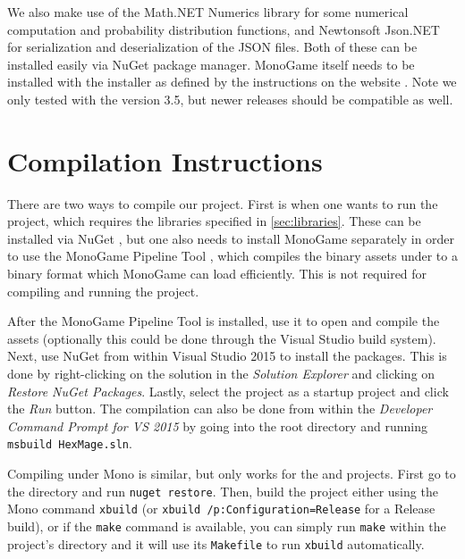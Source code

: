 We also make use of the Math.NET Numerics \citep{math-dotnet} library for some numerical computation and probability distribution functions, and Newtonsoft Json.NET \citep{json-dotnet} for serialization and deserialization of the JSON files. Both of these can be installed easily via NuGet \citep{nuget} package manager. MonoGame itself needs to be installed with the installer as defined by the instructions on the website \citep{monogame}. Note we only tested with the version 3.5, but newer releases should be compatible as well.

\section{Compilation Instructions}

There are two ways to compile our project. First is when one wants to run the  project, which requires the libraries specified in \autoref{sec:libraries}. These can be installed via NuGet \citep{nuget}, but one also needs to install MonoGame separately in order to use the MonoGame Pipeline Tool \citep{monogame-pipeline}, which compiles the binary assets under  to a binary format which MonoGame can load efficiently. This is not required for compiling and running the  project.

After the MonoGame Pipeline Tool is installed, use it to open  and compile the assets (optionally this could be done through the Visual Studio build system). Next, use NuGet from within Visual Studio 2015 to install the packages. This is done by right-clicking on the  solution in the \emph{Solution Explorer} and clicking on \emph{Restore NuGet Packages}. Lastly, select the  project as a startup project and click the \emph{Run} button. The compilation can also be done from within the \emph{Developer Command Prompt for VS 2015} by going into the root  directory and running \verb|msbuild HexMage.sln|.

Compiling under Mono is similar, but only works for the  and  projects. First go to the  directory and run \verb|nuget restore|. Then, build the project either using the Mono command \verb|xbuild| (or \verb|xbuild /p:Configuration=Release| for a Release build), or if the \verb|make| command is available, you can simply run \verb|make| within the project's directory and it will use its \verb|Makefile| to run \verb|xbuild| automatically.

